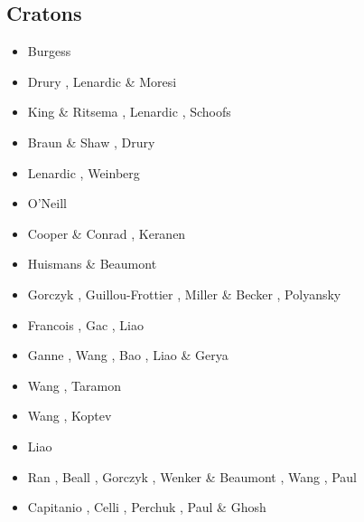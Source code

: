 \subsection{Cratons}

\begin{scriptsize}
\begin{itemize}
\item[\nineteenninetyseven] Burgess \etal \cite{bugm97}
\item[\nineteenninetynine] Drury \etal \cite{drdv99}, Lenardic \& Moresi \cite{lemo99}
\item[\twothousand] King \& Ritsema \cite{kiri00}, Lenardic \etal \cite{lemm00},
                    Schoofs \etal \cite{scth00}
\item[\twothousandone] Braun \& Shaw \cite{brsh01}, Drury \etal \cite{drvc01}
\item[\twothousandthree] Lenardic \etal \cite{lemm03}, Weinberg \etal \cite{wemv03}
\item[\twothousandeight] O'Neill \cite{onlg08}
\item[\twothousandnine] Cooper \& Conrad \cite{coco09}, Keranen \etal \cite{kekj09}
\item[\twothousandeleven] Huismans \& Beaumont \cite{hube11}
\item[\twothousandtwelve] Gorczyk \etal \cite{gohg12}, Guillou-Frottier \etal \cite{gubc12},
                          Miller \& Becker \cite{mibe12}, Polyansky \etal \cite{pokb12}
\item[\twothousandthirteen] Francois \etal \cite{frbm13}, Gac \etal \cite{gahs13},
                            Liao \etal \cite{ligw13}
\item[\twothousandfourteen] Ganne \etal \cite{gagb14}, Wang \etal \cite{wavp14},
                            Bao \etal \cite{baeg14}, Liao \& Gerya \cite{lige14}
\item[\twothousandfifteen] Wang \etal \cite{wahz15,wazh15}, Taramon \etal \cite{tarn15}
\item[\twothousandsixteen] Wang \etal \cite{wahz16}, Koptev \etal \cite{kobc16}
\item[\twothousandseventeen] Liao \etal \cite{liwg17}
\item[\twothousandeighteen] Ran \etal \cite{rabw18}, Beall \etal \cite{bemc18},
                            Gorczyk \etal \cite{gomb18}, Wenker \& Beaumont \cite{webe18b},
                            Wang \etal \cite{wavp18}, Paul \etal \cite{pagc19}
\item[\twothousandtwenty] Capitanio \etal \cite{canc20}, Celli \etal \cite{cels20},
                          Perchuk \etal \cite{pegz20}, Paul \& Ghosh \cite{pagh20}
\end{itemize}
\end{scriptsize}




